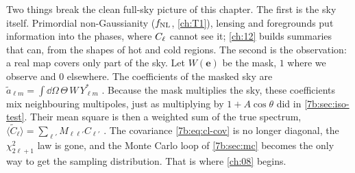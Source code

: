 Two things break the clean full-sky picture of this chapter. The first is the sky itself.
Primordial non-Gaussianity ($f_{\rm NL}$, \cref{ch:T1}), lensing and foregrounds put
information into the phases, where $C_\ell$ cannot see it; \cref{ch:12} builds summaries that can,
from the shapes of hot and cold regions. The second is the observation: a real map covers only
part of the sky. Let $W(\bm e)$ be the mask, $1$ where we observe and $0$ elsewhere. The
coefficients of the masked sky are $\tilde a_{\ell m}=\int\dd\Omega\,\Theta\,W\,Y^*_{\ell m}$
. Because the mask multiplies the sky, these coefficients mix neighbouring
multipoles, just as multiplying by $1+A\cos\theta$ did in \cref{7b:sec:iso-test}. Their mean square
is then a weighted sum of the true spectrum, $\langle\widetilde C_\ell\rangle=\sum_{\ell'}M_{\ell\ell'}C_{\ell'}$
. The covariance \eqref{7b:eq:cl-cov} is no longer diagonal, the
$\chi^2_{2\ell+1}$ law is gone, and the Monte Carlo loop of \cref{7b:sec:mc} becomes the only way to
get the sampling distribution. That is where \cref{ch:08} begins.

